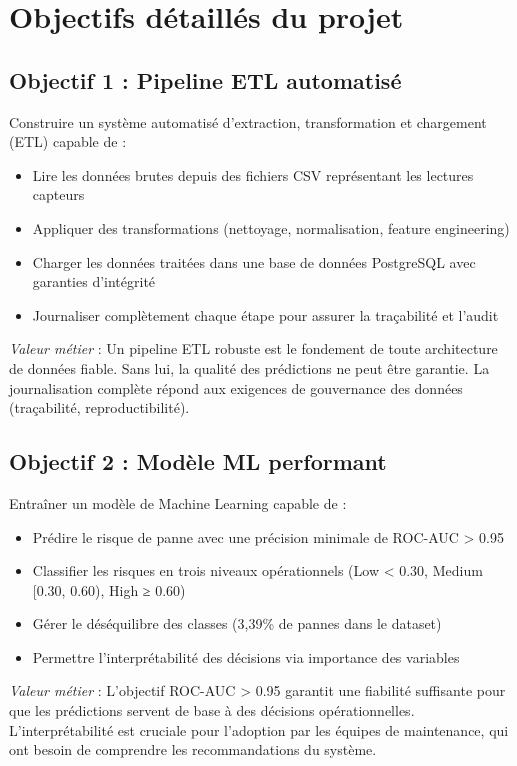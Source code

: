 \documentclass[a4paper,12pt]{report}
\begin{document}
\section{Objectifs détaillés du projet}

\subsection{Objectif 1 : Pipeline ETL automatisé}

Construire un système automatisé d'extraction, transformation et chargement (ETL) capable de :
\begin{itemize}
    \item Lire les données brutes depuis des fichiers CSV représentant les lectures capteurs
    \item Appliquer des transformations (nettoyage, normalisation, feature engineering)
    \item Charger les données traitées dans une base de données PostgreSQL avec garanties d'intégrité
    \item Journaliser complètement chaque étape pour assurer la traçabilité et l'audit
\end{itemize}

\textit{Valeur métier} : Un pipeline ETL robuste est le fondement de toute architecture de données fiable. Sans lui, la qualité des prédictions ne peut être garantie. La journalisation complète répond aux exigences de gouvernance des données (traçabilité, reproductibilité).

\subsection{Objectif 2 : Modèle ML performant}

Entraîner un modèle de Machine Learning capable de :
\begin{itemize}
    \item Prédire le risque de panne avec une précision minimale de ROC-AUC > 0.95
    \item Classifier les risques en trois niveaux opérationnels (Low < 0.30, Medium [0.30, 0.60), High ≥ 0.60)
    \item Gérer le déséquilibre des classes (3,39\% de pannes dans le dataset)
    \item Permettre l'interprétabilité des décisions via importance des variables
\end{itemize}

\textit{Valeur métier} : L'objectif ROC-AUC > 0.95 garantit une fiabilité suffisante pour que les prédictions servent de base à des décisions opérationnelles. L'interprétabilité est cruciale pour l'adoption par les équipes de maintenance, qui ont besoin de comprendre les recommandations du système.
\end{document}
